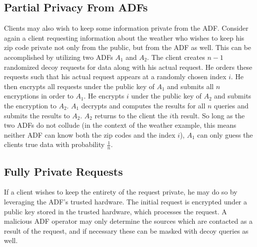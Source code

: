 \subsection{Partial Privacy From ADFs}
    Clients may also wish to keep some information private from the ADF.  Consider again a client requesting information about the weather who wishes to keep his zip code private not only from the public, but from the ADF as well.  This can be accomplished by utilizing two ADFs $A_1$ and $A_2$.  The client creates $n-1$ randomized decoy requests for data along with his actual request.  He orders these requests such that his actual request appears at a randomly chosen index $i$.  He then encrypts all requests under the public key of $A_1$ and submits all $n$ encryptions in order to $A_1$.  He encrypts $i$ under the public key of $A_2$ and submits the encryption to $A_2$.  $A_1$ decrypts and computes the results for all $n$ queries and submits the results to $A_2$.  $A_2$ returns to the client the $i$th result.  So long as the two ADFs do not collude (in the context of the weather example, this means neither ADF can know both the zip codes and the index $i$), $A_1$ can only guess the clients true data with probability $\frac{1}{n}$.   
    
    

\subsection{Fully Private Requests}
    If a client wishes to keep the entirety of the request private, he may do so by leveraging the ADF's trusted hardware.  The initial request is encrypted under a public key stored in the trusted hardware, which processes the request.  A malicious ADF operator may only determine the sources which are contacted as a result of the request, and if necessary these can be masked with decoy queries as well.

